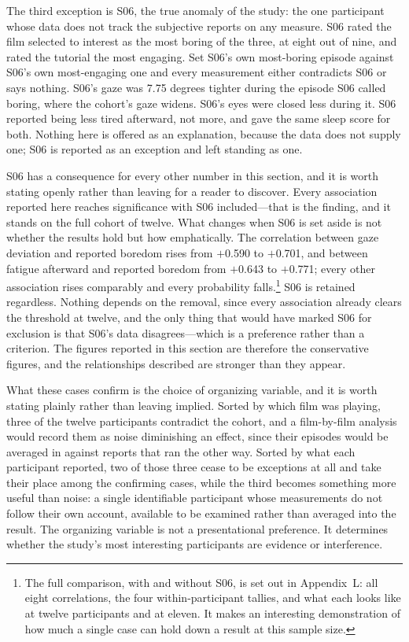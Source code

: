 The third exception is S06, the true anomaly of the study: the one participant whose data does
not track the subjective reports on any measure. S06 rated the film selected to interest
as the most boring of the three, at eight out of nine, and rated the tutorial the most engaging.
Set S06's own most-boring episode against S06's own most-engaging one and every measurement
either contradicts S06 or says nothing. S06's gaze was 7.75 degrees tighter during the episode
S06 called boring, where the cohort's gaze widens. S06's eyes were closed less during it. S06
reported being less tired afterward, not more, and gave the same sleep score for both. Nothing
here is offered as an explanation, because the data does not supply one; S06 is reported as an
exception and left standing as one.

S06 has a consequence for every other number in this section, and it is worth stating openly
rather than leaving for a reader to discover. Every association reported here reaches
significance with S06 included---that is the finding, and it stands on the full cohort of
twelve. What changes when S06 is set aside is not whether the results hold but how emphatically.
The correlation between gaze deviation and reported boredom rises from $+$0.590 to $+$0.701, and
between fatigue afterward and reported boredom from $+$0.643 to $+$0.771; every other
association rises comparably and every probability falls.\footnote{The full comparison, with and
without S06, is set out in Appendix~L: all eight correlations, the four within-participant
tallies, and what each looks like at twelve participants and at eleven. It makes an interesting
demonstration of how much a single case can hold down a result at this sample size.} S06 is
retained regardless. Nothing depends on the removal, since every association already clears the
threshold at twelve, and the only thing that would have marked S06 for exclusion is that S06's
data disagrees---which is a preference rather than a criterion. The figures reported in this
section are therefore the conservative figures, and the relationships described are stronger
than they appear.

What these cases confirm is the choice of organizing variable, and it is worth stating plainly
rather than leaving implied. Sorted by which film was playing, three of the twelve participants
contradict the cohort, and a film-by-film analysis would record them as noise diminishing an
effect, since their episodes would be averaged in against reports that ran the other way. Sorted by what each participant reported, two of those three cease to be
exceptions at all and take their place among the confirming cases, while the third becomes
something more useful than noise: a single identifiable participant whose measurements do not
follow their own account, available to be examined rather than averaged into the result. The
organizing variable is not a presentational preference. It determines whether the study's most
interesting participants are evidence or interference.

